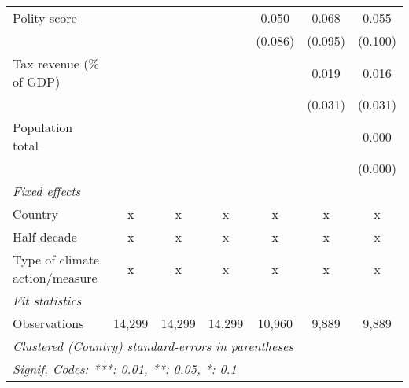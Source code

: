 \begin{tabular}{lcccccc}
   Polity score                                                                &               &               &              & 0.050       & 0.068        & 0.055\\   
                                                                               &               &               &              & (0.086)     & (0.095)      & (0.100)\\   
   Tax revenue (\% of GDP)                                                     &               &               &              &             & 0.019        & 0.016\\   
                                                                               &               &               &              &             & (0.031)      & (0.031)\\   
   Population total                                                            &               &               &              &             &              & 0.000\\   
                                                                               &               &               &              &             &              & (0.000)\\   
   \emph{Fixed effects}\\
   Country                                                                     & x             & x             & x            & x           & x            & x\\  
   Half decade                                                                 & x             & x             & x            & x           & x            & x\\  
   Type of climate action/measure                                              & x             & x             & x            & x           & x            & x\\  
   \midrule \emph{Fit statistics}\\
   Observations                                                                & 14,299        & 14,299        & 14,299       & 10,960      & 9,889        & 9,889\\  
   \midrule
   \multicolumn{7}{l}{\emph{Clustered (Country) standard-errors in parentheses}}\\
   \multicolumn{7}{l}{\emph{Signif. Codes: ***: 0.01, **: 0.05, *: 0.1}}\\
\end{tabular}
\par\endgroup



